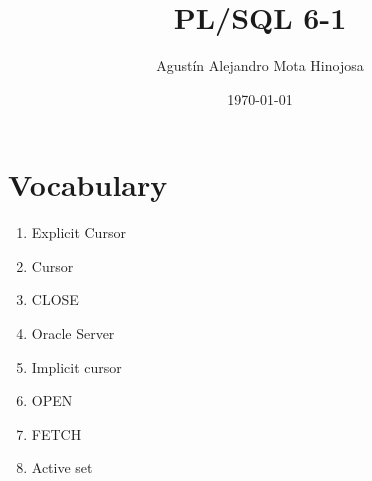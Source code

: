 \documentclass[11pt]{article}
\author{Agustín Alejandro Mota Hinojosa}
\date{\today}
\title{PL/SQL 6-1}
\begin{document}
\maketitle
\tableofcontents

\section{Vocabulary}
\label{sec:orgef2286f}
\begin{enumerate}
\item Explicit Cursor
\item Cursor
\item CLOSE
\item Oracle Server
\item Implicit cursor
\item OPEN
\item FETCH
\item Active set
\end{enumerate}
\end{document}
